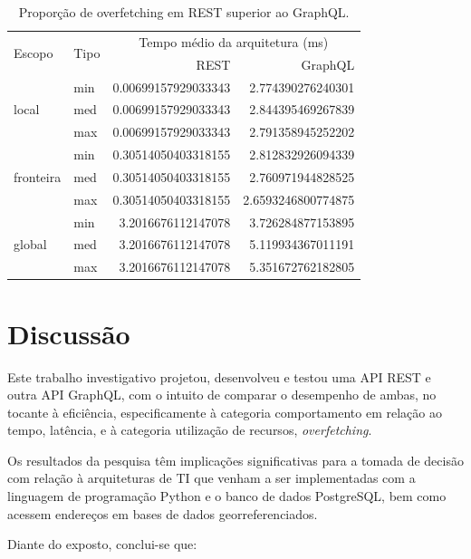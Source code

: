 \documentclass[conference]{IEEEtran}
\begin{document}
\begin{table}
\renewcommand{\arraystretch}{1.3}
\caption{Proporção de overfetching em REST superior ao GraphQL.}
\label{tab:latencia}
\centering
\begin{tabular}{ll|rr}
    \multirow{2}{*}{Escopo} & \multirow{2}{*}{Tipo} & \multicolumn{2}{c}{Tempo médio da arquitetura (ms)} \\
    && REST & GraphQL \\
    \hline
    \multirow{3}{*}{local} & min & 0.00699157929033343 & 2.774390276240301 \\
    & med & 0.00699157929033343 & 2.844395469267839 \\
    & max & 0.00699157929033343 & 2.791358945252202 \\
    \multirow{3}{*}{fronteira} & min & 0.30514050403318155 & 2.812832926094339 \\
    & med & 0.30514050403318155 & 2.760971944828525 \\
    & max & 0.30514050403318155 & 2.6593246800774875 \\
    \multirow{3}{*}{global} & min & 3.2016676112147078 & 3.726284877153895 \\
    & med & 3.2016676112147078 & 5.119934367011191 \\
    & max & 3.2016676112147078 & 5.351672762182805
\end{tabular}
\end{table}

\section{Discussão}
\label{sec:discussao}

Este trabalho investigativo projetou, desenvolveu e testou uma API REST e outra API GraphQL, com o intuito de comparar o desempenho de ambas, no tocante à eficiência, especificamente à categoria comportamento em relação ao tempo, latência, e à categoria utilização de recursos, \textit{overfetching}. 

Os resultados da pesquisa têm implicações significativas para a tomada de decisão com relação à arquiteturas de TI que venham a ser implementadas com a linguagem de programação Python e o banco de dados PostgreSQL, bem como acessem endereços em bases de dados georreferenciados.

Diante do exposto, conclui-se que:
\end{document}
